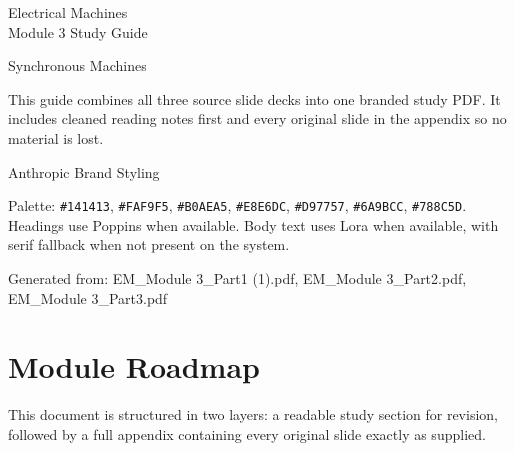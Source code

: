\documentclass[11pt,a4paper]{article}
\begin{document}
\begin{titlepage}
\thispagestyle{empty}
\vspace*{24mm}
{\HeadingFont\fontsize{30}{34}\selectfont\color{anthDark}Electrical Machines\\[0.2em]Module 3 Study Guide\par}
\vspace{5mm}
{\HeadingFont\fontsize{15}{18}\selectfont\color{anthOrange}Synchronous Machines\par}
\vspace{10mm}
{\large This guide combines all three source slide decks into one branded study PDF. It includes cleaned reading notes first and every original slide in the appendix so no material is lost.\par}
\vfill
\begin{mdframed}[roundcorner=8pt,backgroundcolor=anthDark,linecolor=anthDark,linewidth=0pt,innerleftmargin=14pt,innerrightmargin=14pt,innertopmargin=10pt,innerbottommargin=10pt]
{\color{anthLight}\HeadingFont\fontsize{13}{16}\selectfont Anthropic Brand Styling}\par
{\color{anthLight}\small Palette: \texttt{\#141413}, \texttt{\#FAF9F5}, \texttt{\#B0AEA5}, \texttt{\#E8E6DC}, \texttt{\#D97757}, \texttt{\#6A9BCC}, \texttt{\#788C5D}. Headings use Poppins when available. Body text uses Lora when available, with serif fallback when not present on the system.}
\end{mdframed}
\vspace{8mm}
{\color{anthMid}\small Generated from: EM\_Module 3\_Part1 (1).pdf, EM\_Module 3\_Part2.pdf, EM\_Module 3\_Part3.pdf\par}
\end{titlepage}

\tableofcontents
\clearpage

\section{Module Roadmap}
This document is structured in two layers: a readable study section for revision, followed by a full appendix containing every original slide exactly as supplied.
\end{document}

